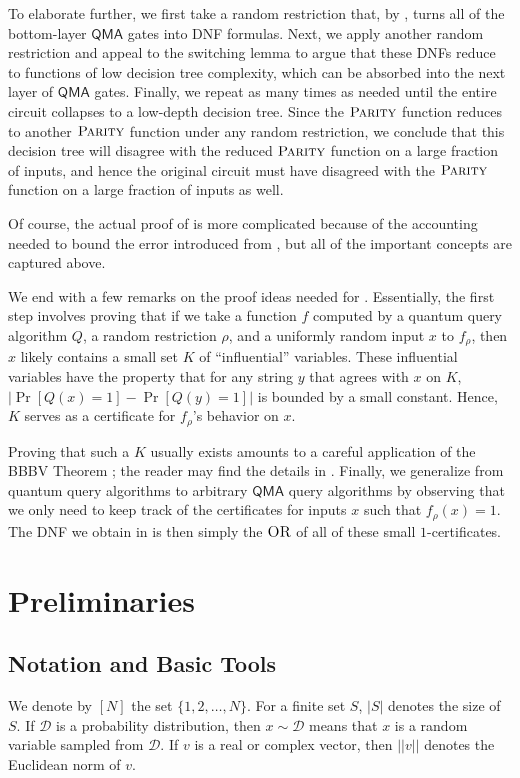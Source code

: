 \documentclass[11pt]{article}%
\newcommand{\OR}{\normalfont\textsc{OR}}
\newcommand{\PARITY}{\normalfont\textsc{Parity}}
\begin{document}
To elaborate further, we first take a random restriction that, by , turns all of the bottom-layer $\mathsf{QMA}$ gates into DNF formulas. Next, we apply another random restriction and appeal to the switching lemma to argue that these DNFs reduce to functions of low decision tree complexity, which can be absorbed into the next layer of $\mathsf{QMA}$ gates. Finally, we repeat as many times as needed until the entire circuit collapses to a low-depth decision tree. Since the $\PARITY$ function reduces to another $\PARITY$ function under any random restriction, we conclude that this decision tree will disagree with the reduced $\PARITY$ function on a large fraction of inputs, and hence the original circuit must have disagreed with the $\PARITY$ function on a large fraction of inputs as well.

Of course, the actual proof of  is more complicated because of the accounting needed to bound the error introduced from , but all of the important concepts are captured above.

We end with a few remarks on the proof ideas needed for . Essentially, the first step involves proving that if we take a function $f$ computed by a quantum query algorithm $Q$, a random restriction $\rho$, and a uniformly random input $x$ to $f_\rho$, then $x$ likely contains a small set $K$ of ``influential'' variables. These influential variables have the property that for any string $y$ that agrees with $x$ on $K$, $\left|\Pr[Q(x) = 1] - \Pr[Q(y) = 1]\right|$ is bounded by a small constant. Hence, $K$ serves as a certificate for $f_\rho$'s behavior on $x$.

Proving that such a $K$ usually exists amounts to a careful application of the BBBV Theorem \cite{BBBV97}; the reader may find the details in . Finally, we generalize from quantum query algorithms to arbitrary $\mathsf{QMA}$ query algorithms by observing that we only need to keep track of the certificates for inputs $x$ such that $f_\rho(x) = 1$. The DNF we obtain in  is then simply the $\OR$ of all of these small $1$-certificates.

\section{Preliminaries}
\subsection{Notation and Basic Tools}
We denote by $[N]$ the set $\{1,2,\ldots,N\}$. For a finite set $S$, $|S|$ denotes the size of $S$. If $\mathcal{D}$ is a probability distribution, then $x \sim \mathcal{D}$ means that $x$ is a random variable sampled from $\mathcal{D}$. If $v$ is a real or complex vector, then $||v||$ denotes the Euclidean norm of $v$.
\end{document}
